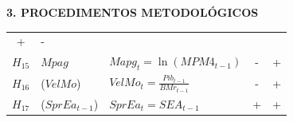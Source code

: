 \documentclass[ignorenonframetext,aspectratio=169,ignorenonframetext]{beamer}
\begin{document}
\begin{frame}{\textbf{3. PROCEDIMENTOS METODOLÓGICOS}}
\begin{longtable}[]{@{}cllcc@{}}
\begin{minipage}[t]{0.11\columnwidth}
+\strut
\end{minipage} & \begin{minipage}[t]{0.11\columnwidth}\centering
-\strut
\end{minipage}\tabularnewline
\begin{minipage}[t]{0.11\columnwidth}\centering
\(H_{15}\)\strut
\end{minipage} & \begin{minipage}[t]{0.15\columnwidth}\raggedright
\(Mpag\)\strut
\end{minipage} & \begin{minipage}[t]{0.39\columnwidth}\raggedright
\(Mapg_{t} = \ln(MPM4_{t-1})\)\strut
\end{minipage} & \begin{minipage}[t]{0.11\columnwidth}\centering
-\strut
\end{minipage} & \begin{minipage}[t]{0.11\columnwidth}\centering
+\strut
\end{minipage}\tabularnewline
\begin{minipage}[t]{0.11\columnwidth}\centering
\(H_{16}\)\strut
\end{minipage} & \begin{minipage}[t]{0.15\columnwidth}\raggedright
(\(VelMo\))\strut
\end{minipage} & \begin{minipage}[t]{0.39\columnwidth}\raggedright
\(VelMo_{t} = \frac{Pib_{t-1}}{BMr_{t-1}}\)\strut
\end{minipage} & \begin{minipage}[t]{0.11\columnwidth}\centering
-\strut
\end{minipage} & \begin{minipage}[t]{0.11\columnwidth}\centering
+\strut
\end{minipage}\tabularnewline
\begin{minipage}[t]{0.11\columnwidth}\centering
\(H_{17}\)\strut
\end{minipage} & \begin{minipage}[t]{0.15\columnwidth}\raggedright
(\(SprEa_{t-1}\))\strut
\end{minipage} & \begin{minipage}[t]{0.39\columnwidth}\raggedright
\(SprEa_{t} = SEA_{t-1}\)\strut
\end{minipage} & \begin{minipage}[t]{0.11\columnwidth}\centering
+\strut
\end{minipage} & \begin{minipage}[t]{0.11\columnwidth}\centering
+\strut
\end{minipage}\tabularnewline
\bottomrule
\end{longtable}

\end{frame}
\end{document}
